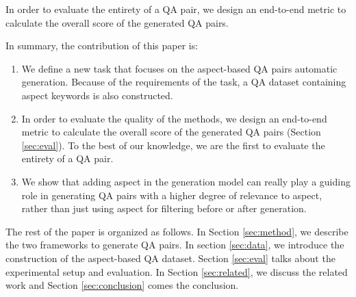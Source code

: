 In order to evaluate the entirety of a QA pair, we design an end-to-end metric to calculate the overall score of the generated QA pairs. 

In summary, the contribution of this paper is:
\begin{enumerate}
\item We define a new task that focuses on the aspect-based QA pairs automatic generation.  Because of the requirements of the task, a  QA dataset containing aspect keywords is also constructed.
\item In order to evaluate the quality of the methods, we design an end-to-end metric to calculate the overall score of the generated QA pairs (Section \ref{sec:eval}). To the best of our knowledge, we are the first to evaluate the entirety of a QA pair.
\item We show that adding aspect in the generation model can really play a guiding role in generating QA pairs with a higher degree of relevance to aspect, rather than just using aspect for filtering before or after generation.
\end{enumerate}

The rest of the paper is organized as follows. In Section \ref{sec:method}, we describe the two frameworks to generate QA pairs. 
In section \ref{sec:data}, we introduce the construction of the aspect-based QA dataset.
Section \ref{sec:eval} talks about the experimental setup and evaluation. 
In Section \ref{sec:related}, we discuss the related work and Section \ref{sec:conclusion} comes the conclusion.
 
